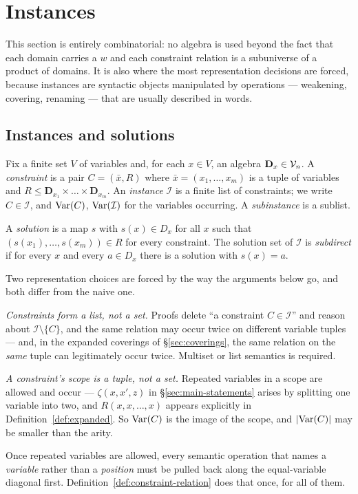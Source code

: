 \section{Instances}\label{sec:instances}

This section is entirely combinatorial: no algebra is used beyond the fact that
each domain carries a $w$ and each constraint relation is a subuniverse of a
product of domains. It is also where the most representation decisions are
forced, because instances are syntactic objects manipulated by operations ---
weakening, covering, renaming --- that are usually described in words.

\subsection{Instances and solutions}

\begin{definition}[Instance]\label{def:instance}
Fix a finite set $V$ of variables and, for each $x\in V$, an algebra
$\mathbf D_{x}\in\mathcal V_{n}$. A \emph{constraint} is a pair
$C=(\bar x,R)$ where $\bar x=(x_{1},\dots,x_{m})$ is a tuple of variables and
$R\le\mathbf D_{x_{1}}\times\dots\times\mathbf D_{x_{m}}$. An
\emph{instance} $\mathcal I$ is a finite list of constraints; we write
$C\in\mathcal I$, and $\operatorname{Var}(C)$, $\operatorname{Var}(\mathcal I)$ for the variables
occurring. A \emph{subinstance} is a sublist.

A \emph{solution} is a map $s$ with $s(x)\in D_{x}$ for all $x$ such that
$(s(x_{1}),\dots,s(x_{m}))\in R$ for every constraint. The solution set of
$\mathcal I$ is \emph{subdirect} if for every $x$ and every $a\in D_{x}$ there
is a solution with $s(x)=a$.
\end{definition}

\begin{hazard}\label{haz:instance-list}
Two representation choices are forced by the way the arguments below go, and
both differ from the naive one.

\emph{Constraints form a list, not a set.} Proofs delete ``a constraint
$C\in\mathcal I$'' and reason about $\mathcal I\setminus\{C\}$, and the same
relation may occur twice on different variable tuples --- and, in the expanded
coverings of \S\ref{sec:coverings}, the same relation on the \emph{same}
tuple can legitimately occur twice. Multiset or list semantics is required.

\emph{A constraint's scope is a tuple, not a set.} Repeated variables in a
scope are allowed and occur --- $\zeta(x,x',z)$ in
\S\ref{sec:main-statements} arises by splitting one variable into two, and
$R(x,x,\dots,x)$ appears explicitly in Definition~\ref{def:expanded}. So
$\operatorname{Var}(C)$ is the image of the scope, and $|{\operatorname{Var}(C)}|$ may be smaller than the
arity.

Once repeated variables are allowed, every semantic operation that names a
\emph{variable} rather than a \emph{position} must be pulled back along the
equal-variable diagonal first. Definition~\ref{def:constraint-relation} does
that once, for all of them.
\end{hazard}

